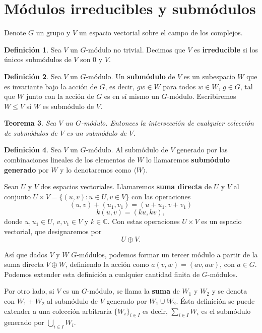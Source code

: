 \documentclass[12pt]{book}
\newtheorem{theorem}{Teorema}[section]
\theoremstyle{definition}
\newtheorem{definition}[theorem]{Definición}
\newcounter{in}
\newcounter{ini}
\begin{document}
\section{Módulos irreducibles y submódulos}
\label{mod-irr-submodulos}
Denote $G$ un grupo y $V$ un espacio vectorial sobre
el campo de los complejos. 

\begin{definition}
  Sea $V$ un $G$-módulo no trivial. Decimos que $V$ es \textbf{irreducible} si
  los únicos submódulos de $V$ son $0$ y $V$.
\end{definition}

\begin{definition}
  Sea $V$ un $G$-módulo. Un \textbf{submódulo} de $V$ es un subespacio
  $W$ que es invariante bajo la acción de $G$, es decir, $ gw\in W$
  para todos $w\in W$, $g\in G$, tal que $W$ junto con la acción de
  $G$ es en sí mismo un $G$-módulo. Escribiremos $W\leq V$ si $W$ es
  submódulo de $V$. 
\end{definition}

\begin{theorem}
  \label{interseccion-submodulos}
  Sea $V$ un $G$-módulo. Entonces la intersección de cualquier
  colección de submódulos de $V$ es un submódulo de $V$.
\end{theorem}

\begin{definition}
  Sea $V$ un $G$-módulo. Al submódulo de $V$ generado por las combinaciones lineales de los
  elementos de $W$ lo llamaremos \textbf{submódulo generado} por $W$ y lo denotaremos como $\langle W\rangle$.
\end{definition}

Sean $U$ y $V$ dos espacios vectoriales. Llamaremos \textbf{suma directa} de
$U$ y $V$ al conjunto $U\times V=\{(u,v):u\in U,v\in V\}$ con las operaciones
$$(u,v)+(u_{1},v_{1})=(u+u_{1},v+v_{1})$$
$$k(u,v)=(ku,kv),$$
donde $u,u_{1}\in U$, $v,v_{1}\in V$ y $k\in \mathbb{C}$. Con estas
operaciones $U\times V$ es un espacio vectorial, que designaremos por
$$U\oplus V.$$

Así que dados $V$ y $W$ $G$-módulos, podemos formar un tercer módulo a partir
de la suma directa $V\oplus W$, definiendo la acción como
$a(v,w)=(av,aw)$, con $a\in G$. Podemos extender esta definición a cualquier
cantidad finita de $G$-módulos.

Por otro lado, si $V$ es un $G$-módulo, se llama la \textbf{suma} de $W_{1}$ y $W_{2}$ y se denota con
$W_{1}+W_{2}$ al submódulo de $V$ generado por $W_{1}\cup W_{2}$. Ésta definición se puede extender a una
colección arbitraria $\{W_{i}\}_{i\in I}$ es
decir, $\sum_{i\in I}W_{i}$ es el submódulo generado por $\bigcup_{i\in I}W_{i}$.
\end{document}
